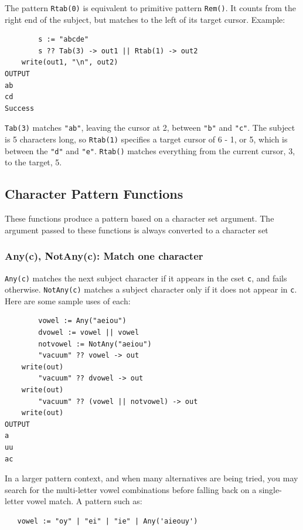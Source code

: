 \documentclass[letterpaper,12pt]{article}
\begin{document}
The pattern {\tt Rtab(0)} is equivalent to primitive pattern {\tt Rem()}.
It counts from the right end of the subject, but matches to the left of
its target cursor. Example:

\begin{verbatim}
        s := "abcde"
        s ?? Tab(3) -> out1 || Rtab(1) -> out2
	write(out1, "\n", out2)
OUTPUT
ab
cd
Success
\end{verbatim}


{\tt Tab(3)} matches \texttt{"ab"}, leaving the cursor at 2, between
\texttt{"b"} and \texttt{"c"}. The subject is 5 characters long, so
{\tt Rtab(1)} specifies a target cursor of 6 - 1, or 5, which is between
the {\tt "d"} and {\tt "e"}.
{\tt Rtab()} matches everything from the current cursor,
3, to the target, 5.

\subsection{Character Pattern Functions}

These functions produce a pattern based on a character set
argument. The argument passed to these functions is always converted
to a character set

\subsubsection{Any(c), NotAny(c): Match one character}

{\tt Any(c)} matches the next subject character if it appears in the cset
{\tt c}, and fails otherwise. {\tt NotAny(c)} matches a subject
character only if it does not appear in {\tt c}. Here are some sample
uses of each:

\begin{verbatim}
        vowel := Any("aeiou")
        dvowel := vowel || vowel
        notvowel := NotAny("aeiou")
        "vacuum" ?? vowel -> out
	write(out)
        "vacuum" ?? dvowel -> out
	write(out)
        "vacuum" ?? (vowel || notvowel) -> out
	write(out)
OUTPUT
a
uu
ac
\end{verbatim}

In a larger pattern context, and when many alternatives are being
tried, you may search for the multi-letter vowel combinations before
falling back on a single-letter vowel match. A pattern such as:

\begin{verbatim}
   vowel := "oy" | "ei" | "ie" | Any('aieouy')
\end{verbatim}
\end{document}
